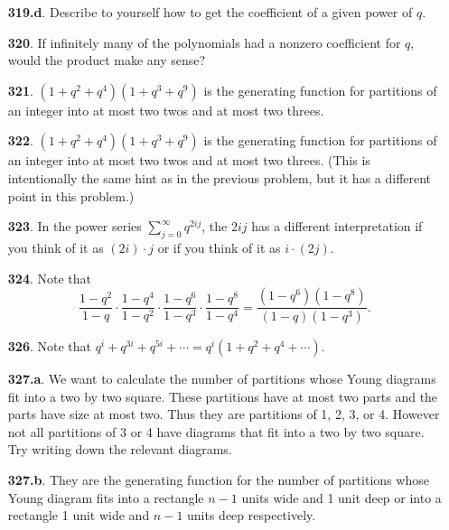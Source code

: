\documentclass[10pt,]{book}
\theoremstyle{plain}
\theoremstyle{definition}
\theoremstyle{definition}
\theoremstyle{definition}
\numberwithin{equation}{chapter}
\begin{document}
\begin{itemize}[itemsep=1em]
\item[\textbf{319.d}.]\hypertarget{p-1587}{}%
Describe to yourself how to get the coefficient of a given power of \(q\).%

\item[\textbf{320}.]\hypertarget{p-1593}{}%
If infinitely many of the polynomials had a nonzero coefficient for \(q\), would the product make any sense?%

\item[\textbf{321}.]\hypertarget{p-1596}{}%
\((1 + q^2 + q^4 )(1 + q^3 + q^9 )\) is the generating function for partitions of an integer into at most two twos and at most two threes.%

\item[\textbf{322}.]\hypertarget{p-1599}{}%
\((1 + q^2 + q^4 )(1 + q^3 + q^9 )\) is the generating function for partitions of an integer into at most two twos and at most two threes. (This is intentionally the same hint as in the previous problem, but it has a different point in this problem.)%

\item[\textbf{323}.]\hypertarget{p-1602}{}%
In the power series \(\sum_{j=0}^\infty q^{2ij}\), the \(2ij\) has a different interpretation if you think of it as \((2i) \cdot j\) or if you think of it as \(i \cdot (2j)\).%

\item[\textbf{324}.]\hypertarget{p-1605}{}%
Note that%
\begin{equation*}
\frac{1-q^2}{1-q}\cdot \frac{1-q^4}{1-q^2}\cdot \frac{1-q^6}{1-q^3}\cdot \frac{1-q^8}{1-q^4} = \frac{(1-q^6)(1-q^8)}{(1-q)(1-q^3)} \text{.}
\end{equation*}
%

\item[\textbf{326}.]\hypertarget{p-1611}{}%
Note that \(q^i + q^{3i} + q^{5i} + \cdots = q^i (1 + q^2 + q^4 + \cdots)\).%

\item[\textbf{327.a}.]\hypertarget{p-1615}{}%
We want to calculate the number of partitions whose Young diagrams fit into a two by two square. These partitions have at most two parts and the parts have size at most two. Thus they are partitions of 1, 2, 3, or 4. However not all partitions of 3 or 4 have diagrams that fit into a two by two square. Try writing down the relevant diagrams.%

\item[\textbf{327.b}.]\hypertarget{p-1618}{}%
They are the generating function for the number of partitions whose Young diagram fits into a rectangle \(n - 1\) units wide and 1 unit deep or into a rectangle 1 unit wide and \(n - 1\) units deep respectively.%


\end{itemize}
\end{document}
